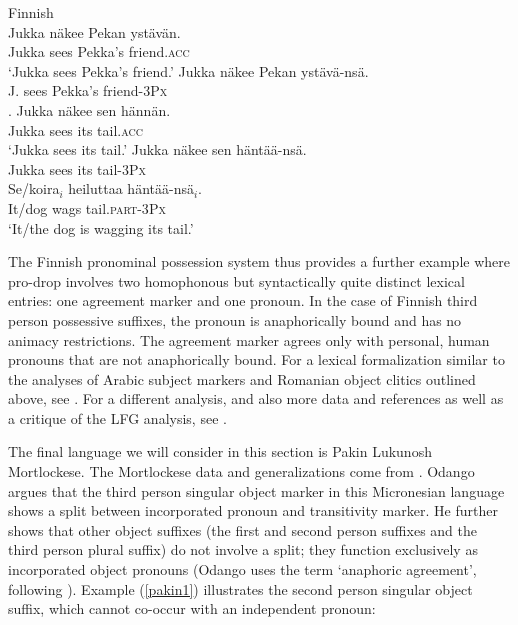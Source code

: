 \documentclass[output=paper,hidelinks]{langscibook}
\begin{document}
\newpage
 \ea Finnish\\
 \ea\label{fi3}  \gll 
    Jukka  n\"{a}kee  Pekan yst\"{a}v\"{a}n. \\
 Jukka sees Pekka's  friend.\textsc{acc}   \\ 
 \glt `Jukka sees Pekka's friend.'
  \ex   
\gll  *Jukka  n\"{a}kee  Pekan yst\"{a}v\"{a}-ns\"{a}. \\
{ }J. sees Pekka's  friend-3\textsc{Px}      \\

 \ex  \label{fii3} \a.    \gll Jukka  n\"{a}kee  sen h\"{a}nn\"{a}n. \\
 Jukka sees  its  tail.\textsc{acc}  \\ 
 \glt `Jukka sees its tail.'
\ex \label{fii4}      \gll *Jukka  n\"{a}kee  sen h\"{a}nt\"{a}\"{a}-ns\"{a}. \\
{ }Jukka sees its  tail-3\textsc{Px}    \\
 \ex  \label{fi4}  \gll Se/koira$_i$  heiluttaa    h\"{a}nt\"{a}\"{a}-ns\"{a}$_i$. \\
 It/dog wags   tail.\textsc{part}-3\textsc{Px}    \\
 \glt `It/the dog is wagging its tail.'
\z\z

The Finnish pronominal possession system thus provides a further example  where pro-drop involves two homophonous but syntactically quite distinct lexical entries: one agreement marker and one pronoun. In the case of Finnish third person possessive suffixes, the pronoun is anaphorically bound  and has no animacy restrictions. The agreement marker agrees only with personal, human pronouns that are not anaphorically bound.  For a lexical formalization similar to the analyses of Arabic  subject markers and Romanian  object clitics  outlined above,  see  \citet{toivonen96, Toivonen:FinnPoss}.  For a different analysis, and also  more data and references as well as  a critique of the LFG analysis,   see \citet{HuhmarniemiBrattico2015}. 

 The final language we will consider in this section is   Pakin Lukunosh Mortlockese.  The Mortlockese data and generalizations come from       \citet{odango2014}.   Odango argues that the third person singular object marker in  this Micronesian language   shows a split between incorporated pronoun and   transitivity marker.    He further shows that other object suffixes (the first and second person suffixes and the third person plural suffix)    do not involve a split; they function exclusively as  incorporated object pronouns (Odango uses  the term `anaphoric agreement', following \citealt{BM87}).  Example  (\ref{pakin1})  illustrates the second person singular object suffix, which cannot co-occur with an independent pronoun: 
 
\end{document}
